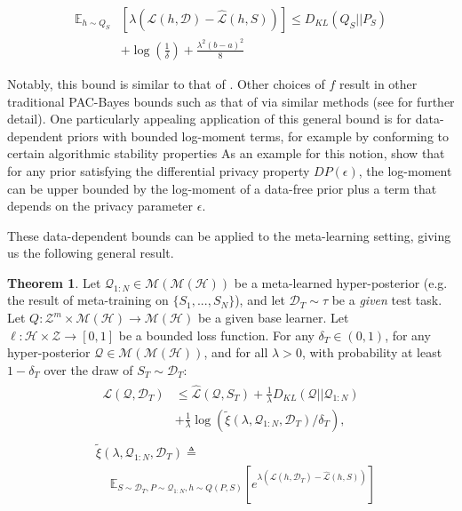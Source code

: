 \documentclass[letterpaper]{article} %
\theoremstyle{definition}
\newtheorem{theorem}{Theorem}[section]
\newcommand{\Expect}[2]{\mathbb{E}_{#1}\left [#2 \right ]}
\begin{document}
\begin{align} 
    \mathbb{E}_{h\sim Q_S}&\left [\lambda(\mathcal{L}(h,\mathcal{D})-\hat{\mathcal{L}}(h, S))\right ]
     \leq D_{KL}(Q_S||P_S) \nonumber\\
    &+\log\left (\frac{1}{\delta}\right ) + \frac{\lambda^2(b-a)^2}{8}
\end{align}

Notably, this bound is similar to that of \citet{Catoni2004}. Other choices of $f$ result in other traditional PAC-Bayes bounds such as that of \citet{Mcallester} via similar methods (see \citet{Rivasplata2020} for further detail). 
One particularly appealing application of this general bound is for data-dependent priors with bounded log-moment terms, for example by conforming to certain algorithmic stability properties 
As an example for this notion, \citet{Rivasplata2020} show that for any prior satisfying the differential privacy property $DP(\epsilon)$, the log-moment can be upper bounded by the log-moment of a data-free prior plus a term that depends on the privacy parameter $\epsilon$. 

These data-dependent bounds can be applied to the meta-learning setting, giving us the following general result. 
%
\begin{theorem} \label{thm:main-result}
	Let $\mathcal{Q}_{1:N}\in \mathcal{M}(\mathcal{M}(\mathcal{H}))$ be a meta-learned hyper-posterior (e.g. the result of meta-training on $\{S_1,...,S_N\}$), and let $\mathcal{D}_T\sim \tau$ be a \emph{given} test task. Let $Q: \mathcal{Z}^m\times\mathcal{M}(\mathcal{H})\rightarrow \mathcal{M}(\mathcal{H})$ be a given base learner. Let $\ell: \mathcal{H}\times \mathcal{Z}\rightarrow [0, 1]$ be a bounded loss function.
	For any $\delta_T \in (0,1)$, for any hyper-posterior $\mathcal{Q}\in \mathcal{M}(\mathcal{M}(\mathcal{H}))$, and for all $\lambda>0$, with probability at least $1-\delta_T$ over the draw of $S_T\sim \mathcal{D}_T$:
	\begin{align} \label{eq:main-result-generic}
	\begin{split}
	\mathcal{L}(\mathcal{Q}, \mathcal{D}_T) &\leq \hat{\mathcal{L}}(\mathcal{Q}, S_T) + \frac{1}{\lambda}D_{KL}(\mathcal{Q}||\mathcal{Q}_{1:N})\\
	&+\frac{1}{\lambda}\log\left ( \tilde{\xi}(\lambda,\mathcal{Q}_{1:N},\mathcal{D}_T)/\delta_T\right ) ,
	\end{split}
	\end{align}
%
	\begin{align*} 
	\begin{split}
	&\tilde{\xi}(\lambda,\mathcal{Q}_{1:N},\mathcal{D}_T)\triangleq \\
	&\;\;\;\; \Expect{S\sim \mathcal{D}_T, P\sim \mathcal{Q}_{1:N}, h\sim Q(P,S)}{e^{\lambda\left (\mathcal{L}(h, \mathcal{D}_T)-\hat{\mathcal{L}}(h, S)\right )}}
	\end{split}
	\end{align*}
	

\end{theorem}
\end{document}
